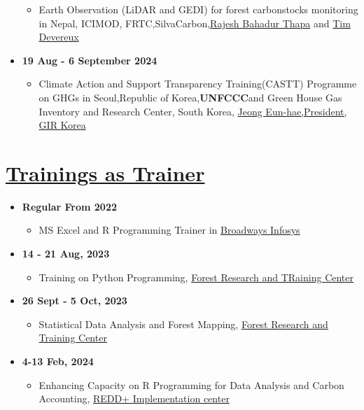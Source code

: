\documentclass[
]{article}
\providecommand{\tightlist}{%
  \setlength{\itemsep}{0pt}\setlength{\parskip}{0pt}}
\begin{document}
\begin{itemize}
  \begin{itemize}
  \tightlist
  \item
    Earth Observation (LiDAR and GEDI) for forest carbonstocks
    monitoring in Nepal, ICIMOD,
    FRTC,SilvaCarbon,\href{https://www.icimod.org/team/rajesh-bahadur-thapa/}{Rajesh
    Bahadur Thapa} and
    \href{https://www.linkedin.com/in/timothy-devereux/}{Tim Devereux}
  \end{itemize}
\item
  \textbf{19 Aug - 6 September 2024}

  \begin{itemize}
  \tightlist
  \item
    Climate Action and Support Transparency Training(CASTT) Programme on
    GHGs in Seoul,Republic of Korea,\textbf{UNFCCC}and Green House Gas
    Inventory and Research Center, South Korea,
    \href{https://www.linkedin.com/in/eunhae-jeong-248a40124/}{Jeong
    Eun-hae,President, GIR Korea}
  \end{itemize}
\end{itemize}

\section{\texorpdfstring{\underline{Trainings as Trainer}}{}}\label{section-8}

\begin{itemize}
\tightlist
\item
  \textbf{Regular From 2022}

  \begin{itemize}
  \tightlist
  \item
    MS Excel and R Programming Trainer in
    \href{https://broadwayinfosys.com/}{Broadways Infosys}
  \end{itemize}
\item
  \textbf{14 - 21 Aug, 2023}

  \begin{itemize}
  \tightlist
  \item
    Training on Python Programming, \href{https://frtc.gov.np/}{Forest
    Research and TRaining Center}
  \end{itemize}
\item
  \textbf{26 Sept - 5 Oct, 2023}

  \begin{itemize}
  \tightlist
  \item
    Statistical Data Analysis and Forest Mapping,
    \href{https://frtc.gov.np/}{Forest Research and Training Center}
  \end{itemize}
\item
  \textbf{4-13 Feb, 2024}

  \begin{itemize}
  \tightlist
  \item
    Enhancing Capacity on R Programming for Data Analysis and Carbon
    Accounting, \href{https://redd.gov.np/}{REDD+ Implementation center}
  \end{itemize}
\end{itemize}
\end{document}
